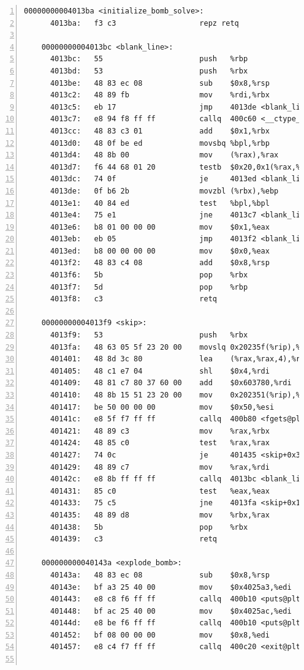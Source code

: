 \documentclass{article}
\begin{document}
\begin{lstlisting}[title = bomb的反汇编代码及部分注释, xleftmargin = 2em,xrightmargin = 2em, aboveskip = 1em, numbers = left, basicstyle=\scriptsize\ttfamily, numberstyle=\scriptsize]
    00000000004013ba <initialize_bomb_solve>:
      4013ba:	f3 c3                	repz retq 
    
    00000000004013bc <blank_line>:
      4013bc:	55                   	push   %rbp
      4013bd:	53                   	push   %rbx
      4013be:	48 83 ec 08          	sub    $0x8,%rsp
      4013c2:	48 89 fb             	mov    %rdi,%rbx
      4013c5:	eb 17                	jmp    4013de <blank_line+0x22>
      4013c7:	e8 94 f8 ff ff       	callq  400c60 <__ctype_b_loc@plt>
      4013cc:	48 83 c3 01          	add    $0x1,%rbx
      4013d0:	48 0f be ed          	movsbq %bpl,%rbp
      4013d4:	48 8b 00             	mov    (%rax),%rax
      4013d7:	f6 44 68 01 20       	testb  $0x20,0x1(%rax,%rbp,2)
      4013dc:	74 0f                	je     4013ed <blank_line+0x31>
      4013de:	0f b6 2b             	movzbl (%rbx),%ebp
      4013e1:	40 84 ed             	test   %bpl,%bpl
      4013e4:	75 e1                	jne    4013c7 <blank_line+0xb>
      4013e6:	b8 01 00 00 00       	mov    $0x1,%eax
      4013eb:	eb 05                	jmp    4013f2 <blank_line+0x36>
      4013ed:	b8 00 00 00 00       	mov    $0x0,%eax
      4013f2:	48 83 c4 08          	add    $0x8,%rsp
      4013f6:	5b                   	pop    %rbx
      4013f7:	5d                   	pop    %rbp
      4013f8:	c3                   	retq   
    
    00000000004013f9 <skip>:
      4013f9:	53                   	push   %rbx
      4013fa:	48 63 05 5f 23 20 00 	movslq 0x20235f(%rip),%rax        # 603760 <num_input_strings>
      401401:	48 8d 3c 80          	lea    (%rax,%rax,4),%rdi
      401405:	48 c1 e7 04          	shl    $0x4,%rdi
      401409:	48 81 c7 80 37 60 00 	add    $0x603780,%rdi
      401410:	48 8b 15 51 23 20 00 	mov    0x202351(%rip),%rdx        # 603768 <infile>
      401417:	be 50 00 00 00       	mov    $0x50,%esi
      40141c:	e8 5f f7 ff ff       	callq  400b80 <fgets@plt>
      401421:	48 89 c3             	mov    %rax,%rbx
      401424:	48 85 c0             	test   %rax,%rax
      401427:	74 0c                	je     401435 <skip+0x3c>
      401429:	48 89 c7             	mov    %rax,%rdi
      40142c:	e8 8b ff ff ff       	callq  4013bc <blank_line>
      401431:	85 c0                	test   %eax,%eax
      401433:	75 c5                	jne    4013fa <skip+0x1>
      401435:	48 89 d8             	mov    %rbx,%rax
      401438:	5b                   	pop    %rbx
      401439:	c3                   	retq   
    
    000000000040143a <explode_bomb>:
      40143a:	48 83 ec 08          	sub    $0x8,%rsp
      40143e:	bf a3 25 40 00       	mov    $0x4025a3,%edi
      401443:	e8 c8 f6 ff ff       	callq  400b10 <puts@plt>
      401448:	bf ac 25 40 00       	mov    $0x4025ac,%edi
      40144d:	e8 be f6 ff ff       	callq  400b10 <puts@plt>
      401452:	bf 08 00 00 00       	mov    $0x8,%edi
      401457:	e8 c4 f7 ff ff       	callq  400c20 <exit@plt>
    

\end{lstlisting}
\end{document}
